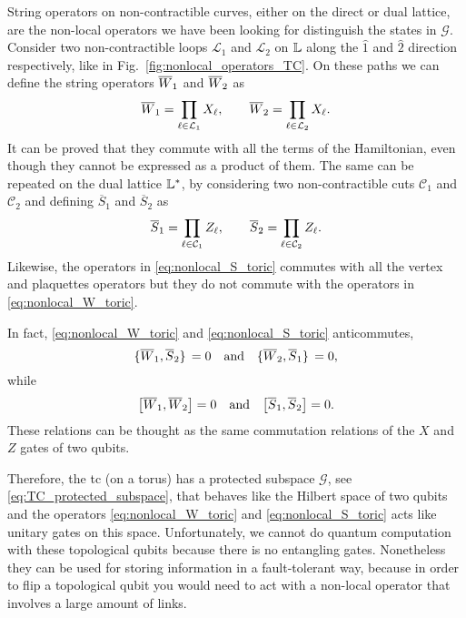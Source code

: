 String operators on non-contractible curves, either on the direct or dual lattice, are the non-local operators we have been looking for distinguish the states in $\mathcal{G}$.
Consider two non-contractible loops $\mathcal{L}_{1}$ and $\mathcal{L}_{2}$ on $\mathbb{L}$ along the $\hat{1}$ and $\hat{2}$ direction respectively, like in Fig.~\ref{fig:nonlocal_operators_TC}.
On these paths we can define the string operators $\overline{W}_1$ and $\overline{W}_2$ as
\begin{equation}
    \overline{W}_1 = \prod_{\ell \in \mathcal{L}_1} X_\ell, \qquad
    \overline{W}_2 = \prod_{\ell \in \mathcal{L}_2} X_\ell.
    \label{eq:nonlocal_W_toric}
\end{equation}
It can be proved that they commute with all the terms of the Hamiltonian, even though they cannot be expressed as a product of them.
The same can be repeated on the dual lattice $\mathbb{L}^{\ast}$, by considering two non-contractible cuts $\mathcal{C}_1$ and $\mathcal{C}_2$ and defining $\overline{S}_1$ and $\overline{S}_2$ as
\begin{equation}
    \overline{S}_1 = \prod_{\ell \in \mathcal{C}_1} Z_\ell, \qquad
    \overline{S}_2 = \prod_{\ell \in \mathcal{C}_2} Z_\ell.
    \label{eq:nonlocal_S_toric}
\end{equation}
Likewise, the operators in \eqref{eq:nonlocal_S_toric} commutes with all the vertex and plaquettes operators but they do not commute with the operators in \eqref{eq:nonlocal_W_toric}.

In fact, \eqref{eq:nonlocal_W_toric} and \eqref{eq:nonlocal_S_toric} anticommutes,
\begin{equation}
    \acomm*{\Wilson_1}{\overline{S}_2} = 0 \qand
    \acomm*{\Wilson_2}{\overline{S}_1} = 0,
    \label{eq:anticommutation_W_S_toric}
\end{equation}
while
\begin{equation}
    \comm{\Wilson_1}{\Wilson_2} = 0 \qand
    \comm{\overline{S}_1}{\overline{S}_2} = 0.
\end{equation}
These relations can be thought as the same commutation relations of the $X$ and $Z$ gates of two qubits.

Therefore, the \ac{tc} (on a torus) has a protected subspace $\mathcal{G}$, see \eqref{eq:TC_protected_subspace}, that behaves like the Hilbert space of two qubits and the operators \eqref{eq:nonlocal_W_toric} and \eqref{eq:nonlocal_S_toric} acts like unitary gates on this space.
Unfortunately, we cannot do quantum computation with these topological qubits because there is no entangling gates.
Nonetheless they can be used for storing information in a fault-tolerant way, because in order to flip a topological qubit you would need to act with a non-local operator that involves a large amount of links.


